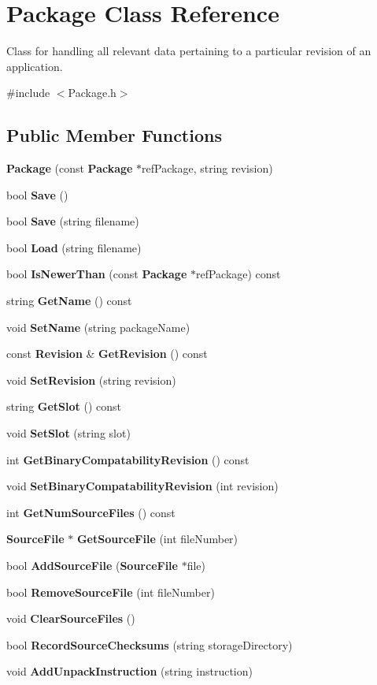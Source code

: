\section{Package Class Reference}
\label{classPackage}


Class for handling all relevant data pertaining to a particular revision of an application.  




{\ttfamily \#include $<$Package.h$>$}

\subsection*{Public Member Functions}
\begin{DoxyCompactItemize}
\item 
{\bf Package} (const {\bf Package} $\ast$refPackage, string revision)
\item 
bool {\bf Save} ()
\item 
bool {\bf Save} (string filename)
\item 
bool {\bf Load} (string filename)
\item 
bool {\bf IsNewerThan} (const {\bf Package} $\ast$refPackage) const 
\item 
string {\bf GetName} () const 
\item 
void {\bf SetName} (string packageName)
\item 
const {\bf Revision} \& {\bf GetRevision} () const 
\item 
void {\bf SetRevision} (string revision)
\item 
string {\bf GetSlot} () const 
\item 
void {\bf SetSlot} (string slot)
\item 
int {\bf GetBinaryCompatabilityRevision} () const 
\item 
void {\bf SetBinaryCompatabilityRevision} (int revision)
\item 
int {\bf GetNumSourceFiles} () const 
\item 
{\bf SourceFile} $\ast$ {\bf GetSourceFile} (int fileNumber)
\item 
bool {\bf AddSourceFile} ({\bf SourceFile} $\ast$file)
\item 
bool {\bf RemoveSourceFile} (int fileNumber)
\item 
void {\bf ClearSourceFiles} ()
\item 
bool {\bf RecordSourceChecksums} (string storageDirectory)
\item 
void {\bf AddUnpackInstruction} (string instruction)

\end{DoxyCompactItemize}
